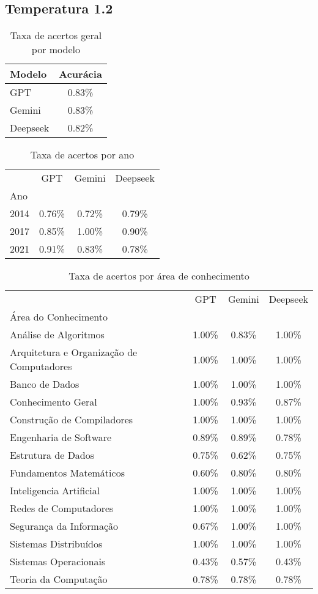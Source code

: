 \subsection{Temperatura 1.2}

\begin{table}[H]
\centering
\caption{Taxa de acertos geral por modelo}
\label{tab:acuracia_geral}
\begin{tabular}{l c}
\toprule
Modelo & Acurácia \\
\midrule
GPT & 0.83\% \\
Gemini & 0.83\% \\
Deepseek & 0.82\% \\
\bottomrule
\end{tabular}
\end{table}


\begin{table}[H]
\centering
\caption{Taxa de acertos por ano}
\label{tab:acuracia_ano}
\begin{tabular}{l c c c}
\toprule
 & GPT & Gemini & Deepseek \\
Ano &  &  &  \\
\midrule
2014 & 0.76\% & 0.72\% & 0.79\% \\
2017 & 0.85\% & 1.00\% & 0.90\% \\
2021 & 0.91\% & 0.83\% & 0.78\% \\
\bottomrule
\end{tabular}
\end{table}


\begin{table}[H]
\centering
\caption{Taxa de acertos por área de conhecimento}
\label{tab:acuracia_area}
\begin{tabular}{l c c c}
\toprule
 & GPT & Gemini & Deepseek \\
Área do Conhecimento &  &  &  \\
\midrule
Análise de Algoritmos & 1.00\% & 0.83\% & 1.00\% \\
Arquitetura e Organização de Computadores & 1.00\% & 1.00\% & 1.00\% \\
Banco de Dados & 1.00\% & 1.00\% & 1.00\% \\
Conhecimento Geral & 1.00\% & 0.93\% & 0.87\% \\
Construção de Compiladores & 1.00\% & 1.00\% & 1.00\% \\
Engenharia de Software & 0.89\% & 0.89\% & 0.78\% \\
Estrutura de Dados & 0.75\% & 0.62\% & 0.75\% \\
Fundamentos Matemáticos & 0.60\% & 0.80\% & 0.80\% \\
Inteligencia Artificial & 1.00\% & 1.00\% & 1.00\% \\
Redes de Computadores & 1.00\% & 1.00\% & 1.00\% \\
Segurança da Informação & 0.67\% & 1.00\% & 1.00\% \\
Sistemas Distribuídos & 1.00\% & 1.00\% & 1.00\% \\
Sistemas Operacionais & 0.43\% & 0.57\% & 0.43\% \\
Teoria da Computação & 0.78\% & 0.78\% & 0.78\% \\
\bottomrule
\end{tabular}
\end{table}
